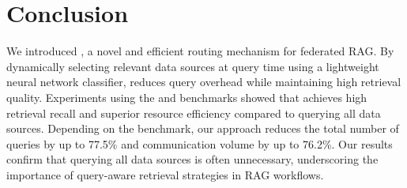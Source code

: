 \section{Conclusion}
\label{sec:conclusion}

We introduced \sys, a novel and efficient routing mechanism for federated \ac{RAG}. 
By dynamically selecting relevant data sources at query time using a lightweight neural network classifier, \sys reduces query overhead while maintaining high retrieval quality. 
Experiments using the \mirage and \mmlu benchmarks showed that \sys achieves high retrieval recall and superior resource efficiency compared to querying all data sources. 
Depending on the benchmark, our approach reduces the total number of queries by up to 77.5\% and communication volume by up to 76.2\%.
Our results confirm that querying all data sources is often unnecessary, underscoring the importance of query-aware retrieval strategies in \ac{RAG} workflows.

